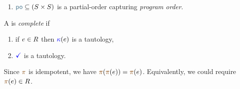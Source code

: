 \begin{definition}
\begin{enumerate}[,label=(\textsc{m}\arabic*),ref=\textsc{m}\arabic*]
\begin{multicols}{2}
\begin{enumerate}
    \item \label{pom-m-kappa} 
      if $\aEv\in\dmEvs$ then 
    \end{enumerate}
    \end{multicols}

  \item \label{pom-po} 
    ${\rpox} \subseteq (\umEvs\times\umEvs)$ is a partial-order capturing
    \emph{program order}.
  \end{enumerate}


  A \PwTpo{} is \emph{complete} if 
  \begin{multicols}{2}
    \begin{enumerate}[,label=(\textsc{c}\arabic*),ref=\textsc{c}\arabic*]

      \setcounter{enumi}{\value{Bkappa}}
    \item \label{top-kappa-c11}
      if $e\in R$ then ${\color{blue}\kappa}(e)$ is a tautology,


      \setcounter{enumi}{\value{Bterm}}
    \item \label{top-term-c11}
      $\aTerm$ is a tautology.
    \end{enumerate}
  \end{multicols}
\end{definition}
Since $\fmrg{}$ is idempotent, we have $\fmrg{\fmrg{\aEv}} = \fmrg{\aEv}$.
Equivalently, we could require $\fmrg{\aEv}\in\reEvs$.

